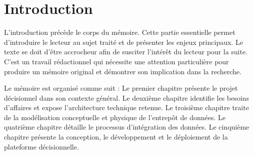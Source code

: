 \chapter*{Introduction}

L'introduction précède le corps du mémoire. Cette partie essentielle permet
d'introduire le lecteur au sujet traité et de présenter les enjeux principaux.
Le texte se doit d'être accrocheur afin de susciter l'intérêt du lecteur pour
la suite. C'est un travail rédactionnel qui nécessite une attention particulière
pour produire un mémoire original et démontrer son implication dans la recherche.

Le mémoire est organisé comme suit :
Le premier chapitre présente le projet décisionnel dans son contexte général.
Le deuxième chapitre identifie les besoins d'affaires et expose l'architecture technique retenue.
Le troisième chapitre traite de la modélisation conceptuelle et physique de l'entrepôt de données.
Le quatrième chapitre détaille le processus d'intégration des données.
Le cinquième chapitre présente la conception, le développement et le déploiement de la plateforme décisionnelle.

